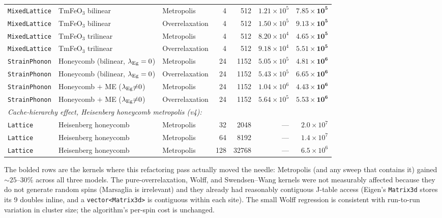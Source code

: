 \documentclass[11pt,letterpaper]{article}
\begin{document}
\begin{table}[t]
\begin{tabular}{lllrrrr}
\midrule
\texttt{MixedLattice} & TmFeO$_3$ bilinear  & Metropolis     & 4 & 512  & $1.21{\times}10^{5}$ & $\mathbf{7.85{\times}10^{5}}$ \\
\texttt{MixedLattice} & TmFeO$_3$ bilinear  & Overrelaxation & 4 & 512  & $1.50{\times}10^{5}$ & $\mathbf{9.13{\times}10^{5}}$ \\
\texttt{MixedLattice} & TmFeO$_3$ trilinear & Metropolis     & 4 & 512  & $8.20{\times}10^{4}$ & $\mathbf{4.65{\times}10^{5}}$ \\
\texttt{MixedLattice} & TmFeO$_3$ trilinear & Overrelaxation & 4 & 512  & $9.18{\times}10^{4}$ & $\mathbf{5.51{\times}10^{5}}$ \\
\midrule
\texttt{StrainPhonon} & Honeycomb (bilinear, $\lambda_{\rm Eg}=0$) & Metropolis     & 24 & 1152 & $5.05{\times}10^{5}$ & $\mathbf{4.81{\times}10^{6}}$ \\
\texttt{StrainPhonon} & Honeycomb (bilinear, $\lambda_{\rm Eg}=0$) & Overrelaxation & 24 & 1152 & $5.43{\times}10^{5}$ & $\mathbf{6.65{\times}10^{6}}$ \\
\texttt{StrainPhonon} & Honeycomb $+$ ME ($\lambda_{\rm Eg}{\ne}0$) & Metropolis     & 24 & 1152 & $1.04{\times}10^{6}$ & $\mathbf{4.43{\times}10^{6}}$ \\
\texttt{StrainPhonon} & Honeycomb $+$ ME ($\lambda_{\rm Eg}{\ne}0$) & Overrelaxation & 24 & 1152 & $5.64{\times}10^{5}$ & $\mathbf{5.53{\times}10^{6}}$ \\
\midrule
\multicolumn{7}{l}{\emph{Cache-hierarchy effect, Heisenberg honeycomb metropolis (v4):}} \\
\texttt{Lattice} & Heisenberg honeycomb & Metropolis     & 32  & 2048  & --- & $2.0{\times}10^{7}$ \\
\texttt{Lattice} & Heisenberg honeycomb & Metropolis     & 64  & 8192  & --- & $1.4{\times}10^{7}$ \\
\texttt{Lattice} & Heisenberg honeycomb & Metropolis     & 128 & 32768 & --- & $6.5{\times}10^{6}$ \\
\bottomrule
\end{tabular}
\end{table}

The bolded rows are the kernels where this refactoring pass actually
moved the needle: Metropolis (and any sweep that contains it) gained
$\sim 25$--$30\%$ across all three models.  The pure-overrelaxation,
Wolff, and Swendsen--Wang kernels were not measurably affected because
they do not generate random spins (Marsaglia is irrelevant) and they
already had reasonably contiguous J-table access (Eigen's
\texttt{Matrix3d} stores its 9 doubles inline, and a
\texttt{vector<Matrix3d>} is contiguous within each site).  The
small Wolff regression is consistent with run-to-run variation in
cluster size; the algorithm's per-spin cost is unchanged.
\end{document}
